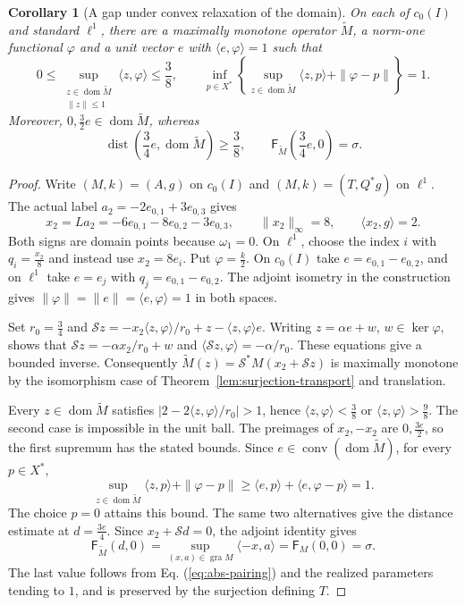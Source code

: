 \documentclass[11pt]{article}
\newcommand{\gra}{\operatorname{gra}}
\newcommand{\dom}{\operatorname{dom}}
\newcommand{\pair}[2]{\langle #1,#2\rangle}
\newtheorem{corollary}{Corollary}
\theoremstyle{definition}
\theoremstyle{remark}
\newcommand{\dist}{\operatorname{dist}}
\begin{document}
\begin{corollary}[A gap under convex relaxation of the domain]
\label{cor:convex-relaxation-recovered}
On each of $c_0(I)$ and standard $\ell^1$, there are a maximally monotone operator $\widetilde M$, a norm-one functional $\varphi$ and a unit vector $e$ with $\pair{e}{\varphi}=1$ such that
\[
0\le\sup_{\substack{z\in\dom\widetilde M\\\|z\|\le1}}\pair{z}{\varphi}\le\frac38,
\qquad
\inf_{p\in X^*}\left\{\sup_{z\in\dom\widetilde M}\pair{z}{p}+\|\varphi-p\|\right\}=1.
\]
Moreover, $0,\frac32e\in\dom\widetilde M$, whereas
\[
\dist\left(\frac34e,\dom\widetilde M\right)\ge\frac38,
\qquad \mathsf F_{\widetilde M}\left(\frac34e,0\right)=\sigma.
\]
\end{corollary}
\begin{proof}
Write $(M,k)=(A,g)$ on $c_0(I)$ and $(M,k)=(T,Q^*g)$ on $\ell^1$. The actual label $a_2=-2e_{0,1}+3e_{0,3}$ gives
\[
x_2=La_2=-6e_{0,1}-8e_{0,2}-3e_{0,3},\qquad \|x_2\|_\infty=8,\qquad \pair{x_2}{g}=2.
\]
Both signs are domain points because $\omega_1=0$. On $\ell^1$, choose the index $i$ with $q_i=\frac{x_2}{8}$ and instead use $x_2=8e_i$. Put $\varphi=\frac{k}{2}$. On $c_0(I)$ take $e=e_{0,1}-e_{0,2}$, and on $\ell^1$ take $e=e_j$ with $q_j=e_{0,1}-e_{0,2}$. The adjoint isometry in the construction gives $\|\varphi\|=\|e\|=\pair{e}{\varphi}=1$ in both spaces.

Set $r_0=\frac34$ and $\mathcal Sz=-x_2\pair{z}{\varphi}/r_0+z-\pair{z}{\varphi}e$. Writing $z=\alpha e+w$, $w\in\ker\varphi$, shows that $\mathcal Sz=-\alpha x_2/r_0+w$ and $\pair{\mathcal Sz}{\varphi}=-\alpha/r_0$. These equations give a bounded inverse. Consequently $\widetilde M(z)=\mathcal S^*M(x_2+\mathcal Sz)$ is maximally monotone by the isomorphism case of Theorem~\ref{lem:surjection-transport} and translation.

Every $z\in\dom\widetilde M$ satisfies $|2-2\pair{z}{\varphi}/r_0|>1$, hence $\pair{z}{\varphi}<\frac38$ or $\pair{z}{\varphi}>\frac98$. The second case is impossible in the unit ball. The preimages of $x_2,-x_2$ are $0,\frac{3e}{2}$, so the first supremum has the stated bounds. Since $e\in\operatorname{conv}(\dom\widetilde M)$, for every $p\in X^*$,
\[
\sup_{z\in\dom\widetilde M}\pair{z}{p}+\|\varphi-p\|
\ge\pair{e}{p}+\pair{e}{\varphi-p}=1.
\]
The choice $p=0$ attains this bound. The same two alternatives give the distance estimate at $d=\frac{3e}{4}$. Since $x_2+\mathcal Sd=0$, the adjoint identity gives
\[
\mathsf F_{\widetilde M}(d,0)
=\sup_{(x,a)\in\gra M}\pair{-x}{a}
=\mathsf F_M(0,0)=\sigma.
\]
The last value follows from Eq. (\ref{eq:abs-pairing}) and the realized parameters tending to $1$, and is preserved by the surjection defining $T$.
\end{proof}
\end{document}
